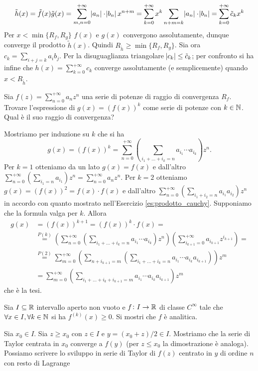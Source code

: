 \documentclass[a4paper]{article}\par \usepackage{style}\par
\begin{document}
\[ \tilde h(x) = \tilde f(x) \tilde g(x) = \sum_{m,n=0}^{+\infty} \abs{a_n} \cdot \abs{b_n} x^{n+m} = \sum_{k=0}^{+\infty} x^k \sum_{n+m=k} \abs{a_n} \cdot \abs{b_n} = \sum_{k=0}^{+\infty} \tilde c_k x^k \]
Per $ x < \min\{R_f, R_g \} $ $ f(x) $ e $ g(x) $ convergono assolutamente, dunque converge il prodotto $ \tilde h(x) $. Quindi $ R_{\tilde h} \ge \min\{ R_f, R_g\} $. Sia ora $ c_k = \sum_{i+j=k} a_i b_j $. Per la disuguaglianza triangolare $ \abs{c_k} \le \tilde c_k $; per confronto si ha infine che $ h(x) = \sum_{k=0}^{+\infty} c_k $ converge assolutamente (e semplicemente) quando $ x < R_{\tilde h} $.\par \begin{es}
  Sia $ f(z) = \sum_{n = 0}^{+\infty} a_n z^n $ una serie di potenze di raggio di convergenza $ R_f $. Trovare l'espressione di $ g(x) = (f(x))^k $ come serie di potenze con $ k \in \mathbb{N} $. Qual è il suo raggio di convergenza?
\end{es}\par Mostriamo per induzione su $ k $ che si ha
\begin{equation*}
  g(x) = (f(x))^k = \sum_{n = 0}^{+\infty} \left(\sum_{i_1 + \ldots + i_k = n} a_{i_1} \cdots a_{i_k}\right) z^n.
\end{equation*}
Per $ k = 1 $ otteniamo da un lato $ g(x) = f(x) $ e dall'altro $ \sum_{n = 0}^{+\infty} \left(\sum_{i_1= n} a_{i_1}\right) z^n = \sum_{n = 0}^{+\infty} a_n z^n $. Per $ k = 2 $ otteniamo $ g(x) = (f(x))^2 = f(x) \cdot f(x) $ e dall'altro $ \sum_{n = 0}^{+\infty} \left(\sum_{i_1 + i_2 = n} a_{i_1} a_{i_2}\right) z^n $ in accordo con quanto mostrato nell'Esercizio \ref{es:prodotto_cauchy}. Supponiamo che la formula valga per $ k $. Allora
\begin{align*}
  g(x) & = (f(x))^{k + 1} = (f(x))^k \cdot f(x) = \\
       & \overset{P(k)}{=} \left(\sum_{n = 0}^{+\infty} \left(\sum_{i_1 + \ldots + i_k = n} a_{i_1} \cdots a_{i_k}\right) z^n\right) \left(\sum_{i_{k + 1} = 0}^{+\infty} a_{i_{k + 1}} z^{i_{k + 1}}\right) = \\
       & \overset{P(2)}{=} \sum_{m = 0}^{+\infty} \left(\sum_{n + i_{k + 1} = m} \left(\sum_{i_1 + \ldots + i_k = n} a_{i_1} \cdots a_{i_k} a_{i_{k + 1}}\right)\right) z^m \\
       & = \sum_{m = 0}^{+\infty} \left(\sum_{i_1 + \ldots + i_k + i_{k + 1} = m} a_{i_1} \cdots a_{i_k} a_{i_{k + 1}}\right) z^m
\end{align*}
che è la tesi.\par \begin{es}
  Sia $ I \subseteq \mathbb{R} $ intervallo aperto non vuoto e $ f \colon I \to \mathbb{R} $ di classe $ C^{\infty} $ tale che $ \forall x \in I, \forall k \in \mathbb{N} $ si ha $ f^{(k)}(x) \geq 0 $. Si mostri che $ f $ è analitica.
\end{es}\par Sia $ x_0 \in I $. Sia $ z \ge x_0 $ con $ z \in I $ e $ y = (x_0 + z)/2 \in I $. Mostriamo che la serie di Taylor centrata in $ x_0 $ converge a $ f(y) $ (per $ z \leq x_0 $ la dimostrazione è analoga). Possiamo scrivere lo sviluppo in serie di Taylor di $ f(z) $ centrato in $ y $ di ordine $ n $ con resto di Lagrange
\end{document}

